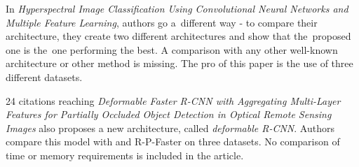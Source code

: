 In \textit{Hyperspectral Image Classification Using Convolutional Neural Networks and Multiple Feature Learning}, authors go a~different way - to compare their architecture, they create two different architectures and show that the~proposed one is the~one performing the best. A comparison with any other well-known architecture or other  method is missing. The pro of this paper is the use of three different datasets.

24 citations reaching \textit{Deformable Faster R-CNN with Aggregating Multi-Layer Features for Partially Occluded Object Detection in Optical Remote Sensing Images} also proposes a new architecture, called \textit{deformable R-CNN}. Authors compare this model with  and R-P-Faster  \cite{rp-faster-rcnn} on three datasets. No comparison of time or memory requirements is included in the article.









